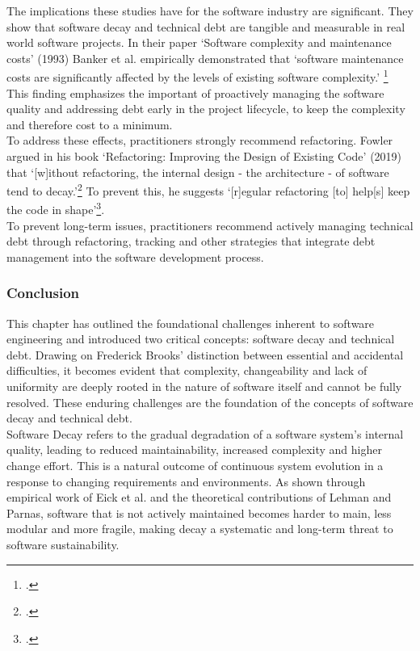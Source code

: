 The implications these studies have for the software industry are significant. They show that software decay and technical debt are tangible and measurable in real world software projects.
In their paper `Software complexity and maintenance costs' (1993) Banker et al. empirically demonstrated that `software maintenance costs are significantly affected by the levels of existing software complexity.' \footcite[12]{bankerSoftwareComplexityMaintenance1993}
This finding emphasizes the important of proactively managing the software quality and addressing debt early in the project lifecycle, to keep the complexity and therefore cost to a minimum.\\
To address these effects, practitioners strongly recommend refactoring. Fowler argued in his book `Refactoring: Improving the Design of Existing Code' (2019)
that `[w]ithout refactoring, the internal design - the architecture - of software tend to decay.'\footcite[58]{fowlerRefactoringImprovingDesign2019}
To prevent this, he suggests `[r]egular refactoring [to] help[s] keep the code in shape'\footcite[58]{fowlerRefactoringImprovingDesign2019}.\\
To prevent long-term issues, practitioners recommend actively managing technical debt through refactoring, tracking and other strategies 
that integrate debt management into the software development process.\\

\subsubsection{Conclusion}

This chapter has outlined the foundational challenges inherent to software engineering and introduced two critical concepts: software decay and technical debt.
Drawing on Frederick Brooks' distinction between essential and accidental difficulties, it becomes evident that complexity, changeability and lack of uniformity are deeply rooted in the nature of software itself and cannot be fully resolved.
These enduring challenges are the foundation of the concepts of software decay and technical debt.\\

Software Decay refers to the gradual degradation of a software system's internal quality, leading to reduced maintainability, increased complexity and higher change effort. This is a natural outcome of continuous system evolution in a response to changing requirements and environments.
As shown through empirical work of Eick et al. and the theoretical contributions of Lehman and Parnas, software that is not actively maintained becomes harder to main, less modular and more fragile, making decay a systematic and long-term threat to software sustainability.\\

